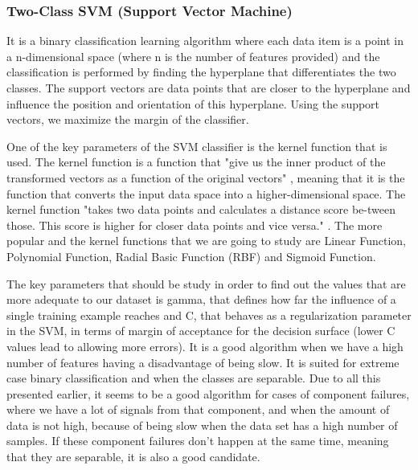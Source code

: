 \subsubsection{Two-Class SVM (Support Vector Machine)}
It is a binary classification learning algorithm where each data item is a point in a n-dimensional space (where n is the number of features provided) and the classification is performed by finding the hyperplane that differentiates the two classes. The support vectors are data points that are closer to the hyperplane and influence the position and orientation of this hyperplane. Using the support vectors, we maximize the margin of the classifier. \cite{SVM}

One of the key parameters of the SVM classifier is the kernel function that is used. The kernel function is a function that "give us the inner product of the transformed vectors as a function of the original vectors" \cite{FCT_AA}, meaning that it is the function that converts the input data space into a higher-dimensional space. The kernel function "takes two data points and calculates a distance score be-tween those. This score is higher for closer data points and vice versa." \cite{SVM}. The more popular and the kernel functions that we are going to study are Linear Function, Polynomial Function, Radial Basic Function (RBF) and Sigmoid Function.

The key parameters that should be study in order to find out the values that are more adequate to our dataset is gamma, that defines how far the influence of a single training example reaches and C, that behaves as a regularization parameter in the SVM, in terms of margin of acceptance for the decision surface (lower C values lead to allowing more errors).
It is a good algorithm when we have a high number of features having a disadvantage of being slow. It is suited for extreme case binary classification and when the classes are separable.
Due to all this presented earlier, it seems to be a good algorithm for cases of component failures, where we have a lot of signals from that component, and when the amount of data is not high, because of being slow when the data set has a high number of samples. If these component failures don't happen at the same time, meaning that they are separable, it is also a good candidate.

